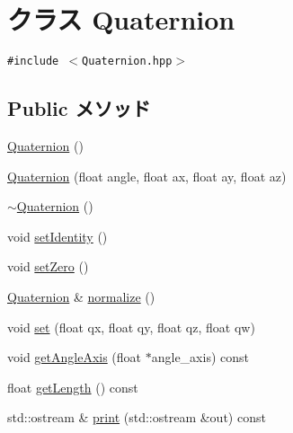 \hypertarget{classm3g_1_1Quaternion}{
\section{クラス Quaternion}
\label{classm3g_1_1Quaternion}
}
{\tt \#include $<$Quaternion.hpp$>$}

\subsection*{Public メソッド}
\begin{CompactItemize}
\item 
\hyperlink{classm3g_1_1Quaternion_65ed15cc19af958b5933b5c522f10e66}{Quaternion} ()
\item 
\hyperlink{classm3g_1_1Quaternion_7a06a28b864e525f73a1bb0eb3e9274e}{Quaternion} (float angle, float ax, float ay, float az)
\item 
\hyperlink{classm3g_1_1Quaternion_6e9a147677b9ffd583c59e9d06c3d938}{$\sim$Quaternion} ()
\item 
void \hyperlink{classm3g_1_1Quaternion_382e6ad7e6721b121e510959e1011be3}{setIdentity} ()
\item 
void \hyperlink{classm3g_1_1Quaternion_47affd1a10b589811fc4828c1a2e0c6d}{setZero} ()
\item 
\hyperlink{classm3g_1_1Quaternion}{Quaternion} \& \hyperlink{classm3g_1_1Quaternion_c9cc178bcc449e08499113c35feb2a2b}{normalize} ()
\item 
void \hyperlink{classm3g_1_1Quaternion_0712dc357557a30ac0da0a9d4cdd278c}{set} (float qx, float qy, float qz, float qw)
\item 
void \hyperlink{classm3g_1_1Quaternion_3049675269aef6bb333d8f83fdf6eed7}{getAngleAxis} (float $\ast$angle\_\-axis) const 
\item 
float \hyperlink{classm3g_1_1Quaternion_b4393f1928cea2a3baadbf9acdd99de2}{getLength} () const 
\item 
std::ostream \& \hyperlink{classm3g_1_1Quaternion_6fea17fa1532df3794f8cb39cb4f911f}{print} (std::ostream \&out) const 
\end{CompactItemize}
